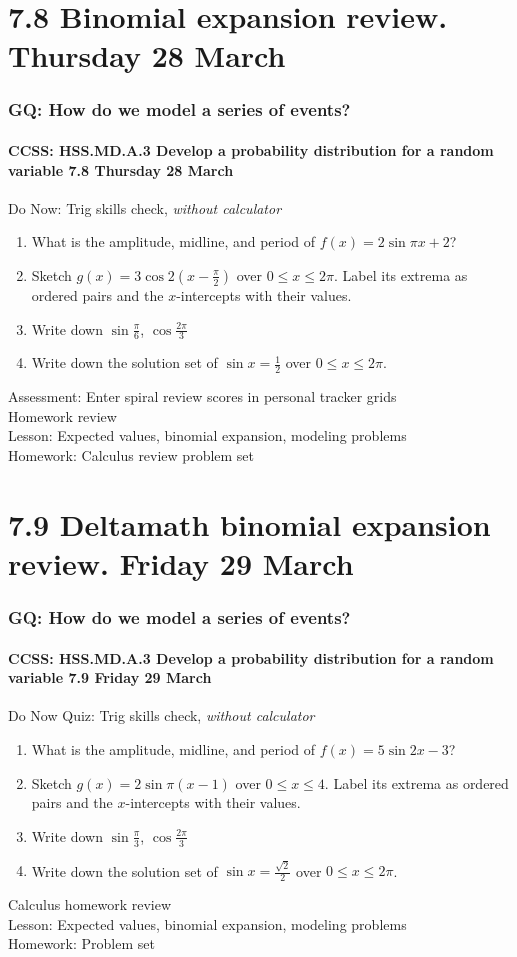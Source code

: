 \documentclass{beamer}
\begin{document}
\section{7.8 Binomial expansion review. Thursday 28 March}
  \frame
  {
    \frametitle{GQ: How do we model a series of events?}
    \framesubtitle{CCSS: HSS.MD.A.3 Develop a probability distribution for a random variable \hfill \alert{7.8 Thursday 28 March}}

    \begin{block}{Do Now: Trig skills check, \emph{without calculator}}
    \begin{enumerate}
        \item What is the amplitude, midline, and period of $f(x)=2\sin \pi x+2$?
        \item Sketch $g(x)=3\cos 2(x- \frac{\pi}{2})$ over $0 \leq x \leq 2 \pi$. Label its extrema as ordered pairs and the $x$-intercepts with their values.
        \item Write down $\sin \frac{\pi}{6}$, $\cos \frac{2\pi}{3}$
        \item Write down the solution set of $\sin x = \frac{1}{2}$ over $0 \leq x \leq 2 \pi$.
    \end{enumerate}
    \end{block}
    Assessment: Enter spiral review scores in personal tracker grids\\
    Homework review\\
    Lesson: Expected values, binomial expansion, modeling problems\\
    Homework: Calculus review problem set
  }

\section{7.9 Deltamath binomial expansion review. Friday 29 March}
  \frame
  {
    \frametitle{GQ: How do we model a series of events?}
    \framesubtitle{CCSS: HSS.MD.A.3 Develop a probability distribution for a random variable \hfill \alert{7.9 Friday 29 March}}

    \begin{block}{Do Now Quiz: Trig skills check, \emph{without calculator}}
    \begin{enumerate}
      \item What is the amplitude, midline, and period of $f(x)=5\sin 2 x-3$?
      \item Sketch $g(x)=2\sin \pi(x- 1)$ over $0 \leq x \leq 4$. Label its extrema as ordered pairs and the $x$-intercepts with their values.
      \item Write down $\sin \frac{\pi}{3}$, $\cos \frac{2\pi}{3}$
      \item Write down the solution set of $\sin x = \frac{\sqrt{2}}{2}$ over $0 \leq x \leq 2 \pi$.
    \end{enumerate}
    \end{block}
    Calculus homework review\\
    Lesson: Expected values, binomial expansion, modeling problems\\
    Homework: Problem set
  }
\end{document}
